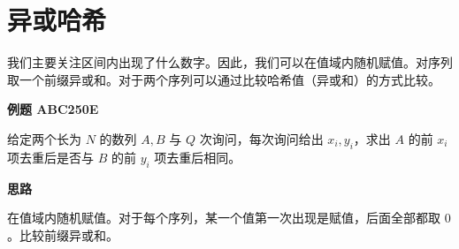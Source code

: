 \section{异或哈希}

我们主要关注区间内出现了什么数字。因此，我们可以在值域内随机赋值。对序列取一个前缀异或和。对于两个序列可以通过比较哈希值（异或和）的方式比较。

\textbf{例题 ABC250E}

给定两个长为 $N$ 的数列 $A,B$ 与 $Q$ 次询问，每次询问给出 $x_i,y_i$，求出 $A$ 的前 $x_i$ 项去重后是否与 $B$ 的前 $y_i$ 项去重后相同。

\textbf{思路}

在值域内随机赋值。对于每个序列，某一个值第一次出现是赋值，后面全部都取 0 。比较前缀异或和。



